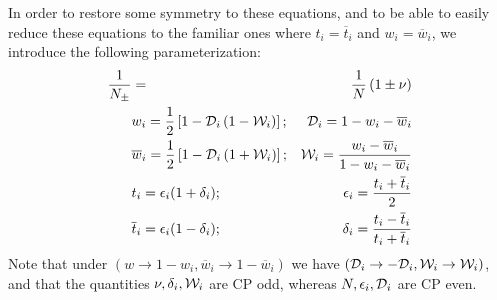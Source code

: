 \documentclass[a4paper,9pt,twoside]{article}
\begin{document}
In order to restore some symmetry to these equations, and to be able to easily reduce these
equations to the familiar ones where $t_i=\overline{t}_i$ and $w_i=\overline{w}_i$, we introduce 
the following parameterization:
\begin{eqnarray}
\frac{1}{N_\pm} &=& \frac{1}{N}\left( 1 \pm \nu \right) \\
&w_i            = \frac{1}{2}\left[1-{\cal D}_i\left(1-{\cal W}_i\right) \right]; &  {\cal D}_i =1-w_i - \overline{w}_i \\
&\overline{w}_i = \frac{1}{2}\left[1-{\cal D}_i\left(1+{\cal W}_i\right) \right]; &  {\cal W}_i = \frac{ w_i - \overline{w}_i}{1-w_i-\overline{w}_i}\\
&t_i            = \epsilon_i(1+\delta_i);                              &  \epsilon_i = \frac{t_i + \overline{t}_i}{2}\\
&\overline{t}_i = \epsilon_i(1-\delta_i);                              &  \delta_i = \frac{t_i - \overline{t}_i}{t_i+\overline{t}_i}
\end{eqnarray}
Note that under $(w\rightarrow 1-w_i, \overline{w}_i\rightarrow 1-\overline{w}_i)$ we have $({\cal D}_i \rightarrow -{\cal D}_i,{\cal W}_i\rightarrow{\cal W}_i)$,
and that the quantities $\nu,\delta_i,{\cal W}_i$ are CP odd, whereas $N,\epsilon_i,{\cal D}_i$ are CP even.
\end{document}
